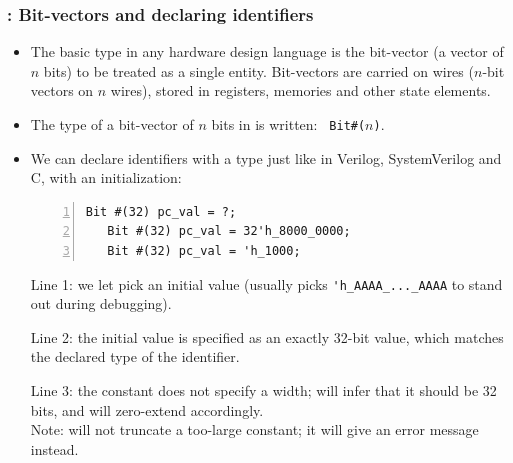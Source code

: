 \begin{frame}[fragile]
\frametitle{{\BSV}: Bit-vectors and declaring identifiers}

\footnotesize

\begin{itemize}

 \item The basic type in any hardware design language is the
       bit-vector (a vector of $n$ bits) to be treated as a single
       entity.  Bit-vectors are carried on wires ($n$-bit vectors on
       $n$ wires), stored in registers, memories and other state
       elements.

 \vspace{1ex}

 \item The type of a bit-vector of $n$ bits in {\BSV} is written: {\tt
       Bit\#($n$)}.

 \vspace{1ex}

 \item We can declare identifiers with a type just like in Verilog,
       SystemVerilog and C, with an initialization:

 \vspace{1ex}

 \begin{Verbatim}[frame=single, numbers=left]
   Bit #(32) pc_val = ?;
   Bit #(32) pc_val = 32'h_8000_0000;
   Bit #(32) pc_val = 'h_1000;
 \end{Verbatim}

 \vspace{1ex}

 Line 1: we let {\bsc} pick an initial value (usually picks
 \verb|'h_AAAA_..._AAAA| to stand out during debugging).

 \vspace{1ex}

 Line 2: the initial value is specified as an exactly 32-bit value,
 which matches the declared type of the identifier.

 \vspace{1ex}

 Line 3: the constant does not specify a width; {\bsc} will infer that
 it should be 32 bits, and will zero-extend accordingly. \\
 Note: {\bsc} will not truncate a too-large constant; it will give an
 error message instead.

\end{itemize}

\end{frame}

